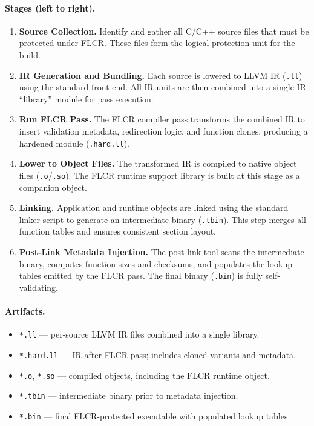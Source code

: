\paragraph{Stages (left to right).}
\begin{enumerate}
  \item \textbf{Source Collection.}  
        Identify and gather all C/C++ source files that must be protected under FLCR.
        These files form the logical protection unit for the build.
  \item \textbf{IR Generation and Bundling.}  
        Each source is lowered to LLVM IR (\texttt{.ll}) using the standard front end.
        All IR units are then combined into a single IR “library” module for pass execution.
  \item \textbf{Run FLCR Pass.}  
        The FLCR compiler pass transforms the combined IR to insert validation metadata,
        redirection logic, and function clones, producing a hardened module
        (\texttt{.hard.ll}).
  \item \textbf{Lower to Object Files.}  
        The transformed IR is compiled to native object files (\texttt{.o}/\texttt{.so}).
        The FLCR runtime support library is built at this stage as a companion object.
  \item \textbf{Linking.}  
        Application and runtime objects are linked using the standard linker script
        to generate an intermediate binary (\texttt{.tbin}). This step merges all
        function tables and ensures consistent section layout.
  \item \textbf{Post-Link Metadata Injection.}  
        The post-link tool scans the intermediate binary, computes function sizes and
        checksums, and populates the lookup tables emitted by the FLCR pass.
        The final binary (\texttt{.bin}) is fully self-validating.
\end{enumerate}


\paragraph{Artifacts.}
\begin{itemize}
  \item \texttt{*.ll} — per-source LLVM IR files combined into a single library.
  \item \texttt{*.hard.ll} — IR after FLCR pass; includes cloned variants and metadata.
  \item \texttt{*.o}, \texttt{*.so} — compiled objects, including the FLCR runtime object.
  \item \texttt{*.tbin} — intermediate binary prior to metadata injection.
  \item \texttt{*.bin} — final FLCR-protected executable with populated lookup tables.
\end{itemize}


